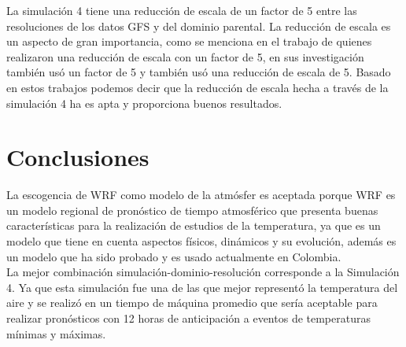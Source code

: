 La simulación 4 tiene una reducción de escala de un factor de 5 entre las resoluciones de los datos GFS y del dominio parental. La reducción de escala es un aspecto de gran importancia, como se menciona en el trabajo de \citet{Corrales2015} quienes realizaron una reducción de escala con un factor de 5, \citet{Parra2012} en sus investigación también usó un factor de 5 y \citep{ArmentaPorras2013} también usó una reducción de escala de 5.  Basado en estos trabajos podemos decir que la reducción de escala hecha a través de la simulación 4 ha es apta y proporciona buenos resultados.\\




\section{Conclusiones}

La escogencia de WRF como modelo de la atmósfer es aceptada porque WRF es un modelo regional de pronóstico de tiempo atmosférico que presenta buenas características para la realización de estudios de la temperatura, ya que es un modelo que tiene en cuenta aspectos físicos, dinámicos y su evolución, además es un modelo que ha sido probado y es usado actualmente en Colombia.\\

La mejor combinación simulación-dominio-resolución corresponde a la Simulación 4. Ya que esta simulación fue una de las que mejor representó la temperatura del aire  y se realizó en un tiempo de máquina promedio que sería aceptable para realizar pronósticos con 12 horas de anticipación a eventos de temperaturas mínimas y máximas.\\

